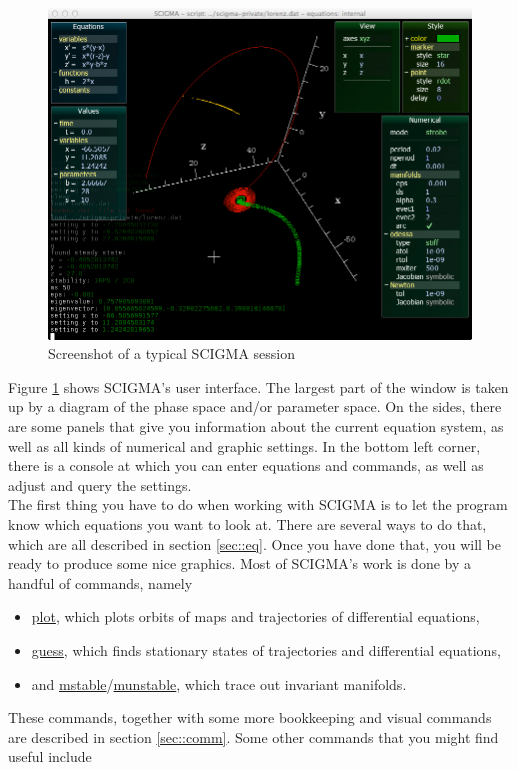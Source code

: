 \documentclass[10pt,a4paper,titlepage]{article}
\newcommand{\HL}[1]{\hyperlink{#1}{#1}}
\begin{document}
\begin{figure}
\includegraphics[width=\textwidth]{scigma.png}
\caption{Screenshot of a typical SCIGMA session}
\label{fig::screen}
\end{figure}
Figure \ref{fig::screen} shows SCIGMA's user interface. The largest part of the window is taken up by a diagram of the phase space and/or parameter space. On the sides, there are some panels that give you information about the current equation system, as well as all kinds of numerical and graphic settings. In the bottom left corner, there is a console at which you can enter equations and commands, as well as adjust and query the settings.\\
The first thing you have to do when working with SCIGMA is to let the program know which equations you want to look at. There are several ways to do that, which are all described in section \ref{sec::eq}. Once you have done that, you will be ready to produce some nice graphics. Most of SCIGMA's work is done by a handful of commands, namely
\begin{itemize}
\item{\HL{plot}, which plots orbits of maps and trajectories of differential equations,}
\item{\HL{guess}, which finds stationary states of trajectories and differential equations,}
\item{and \HL{mstable}/\HL{munstable}, which trace out invariant manifolds.}
\end{itemize}
These commands, together with some more bookkeeping and visual commands are described in section \ref{sec::comm}. Some other commands that you might find useful include
\end{document}
